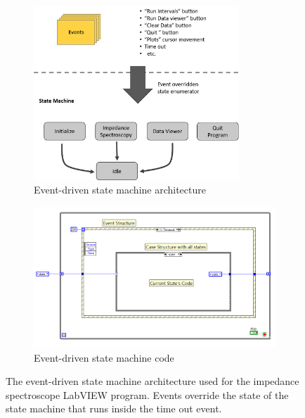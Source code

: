 \begin{figure}[h]
    \centering
    \begin{subfigure}[b]{\textwidth}
        \centering
        \includegraphics[width=0.85\textwidth]{images/program_overview.png}
        \caption{Event-driven state machine architecture}
        \label{fig:IS_architecture}
    \end{subfigure}
    \vspace{0.1 in}
    \vfill
    \begin{subfigure}[b]{\textwidth}
        \centering
        \includegraphics[width=\textwidth]{images/event_driven_SM.png}
        \caption{Event-driven state machine code}
        \label{fig:IS-base_code}
    \end{subfigure}
    \caption[Event-driven state machine architecture]{The event-driven state machine architecture used for the impedance spectroscope LabVIEW program. Events override the state of the state machine that runs inside the time out event.}
    \label{fig:IS_software_design}
\end{figure}
\FloatBarrier

